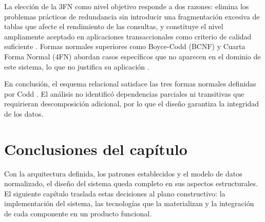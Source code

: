 La elección de la 3FN como nivel objetivo responde a dos razones: elimina los problemas prácticos de redundancia sin introducir una fragmentación excesiva de tablas que afecte el rendimiento de las consultas, y constituye el nivel ampliamente aceptado en aplicaciones transaccionales como criterio de calidad suficiente \cite{date2012}. 
Formas normales superiores como Boyce-Codd (BCNF) y Cuarta Forma Normal (4FN) abordan casos específicos que no aparecen en el dominio de este sistema, lo que no justifica su aplicación \cite{silberschatz2019}.

En conclusión, el esquema relacional satisface las tres formas normales definidas por Codd \cite{codd1970, codd1971}. El análisis no identificó dependencias parciales ni transitivas que requirieran descomposición adicional, por lo que el diseño garantiza la integridad de los datos.


\section{Conclusiones del capítulo}

Con la arquitectura definida, los patrones establecidos y el modelo de datos normalizado, el diseño del sistema queda completo en sus aspectos estructurales. 
El siguiente capítulo traslada estas decisiones al plano constructivo: la implementación del sistema, las tecnologías que la materializan y la integración de cada componente en un producto funcional.











